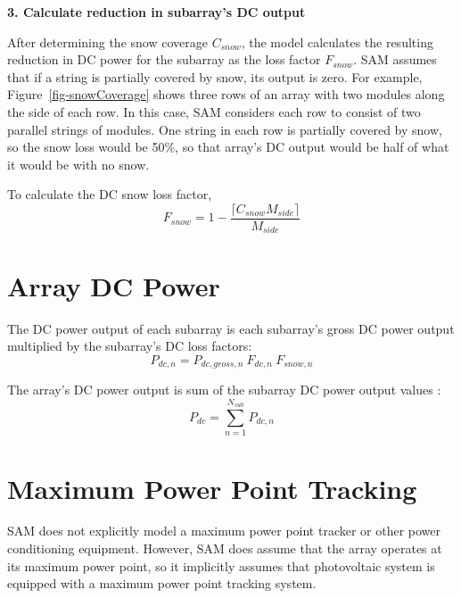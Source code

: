 \documentclass[12pt,letterpaper]{article}
\begin{document}
\textbf{3. Calculate reduction in subarray's DC output}

After determining the snow coverage $C_{snow}$, the model calculates the resulting reduction in DC power for the subarray as the loss factor $F_{snow}$. SAM assumes that if a string is partially covered by snow, its output is zero. For example, Figure~\ref{fig-snowCoverage} shows three rows of an array with two modules along the side of each row. In this case, SAM considers each row to consist of two parallel strings of modules. One string in each row is partially covered by snow, so the snow loss would be 50\%, so that array's DC output would be half of what it would be with no snow.

To calculate the DC snow loss factor,
\begin{equation}
F_{snow} = 1-\frac{\lceil C_{snow}M_{side}\rceil}{M_{side}}
\end{equation}

\section{Array DC Power}

The DC power output of each subarray is each subarray's gross DC power output multiplied by the subarray's DC loss factors:
\begin{equation}
P_{dc,n} = P_{dc,gross,n}~F_{dc,n}~F_{snow,n}
\end{equation}

The array's DC power output is sum of the subarray DC power output values :
\begin{equation}
P_{dc} = \sum_{n=1}^{N_{sub}} P_{dc,n}
\end{equation}

\section{Maximum Power Point Tracking}

SAM does not explicitly model a maximum power point tracker or other power conditioning equipment. However,  SAM does assume that the array operates at its maximum power point, so it implicitly assumes that photovoltaic system is equipped with a maximum power point tracking system. 
\end{document}

